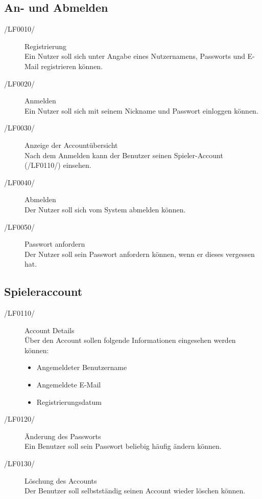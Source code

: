 \documentclass[11pt,a4paper]{scrreprt}
\begin{document}
\subsection{An- und Abmelden}
\begin{description}
\item[/LF0010/] Registrierung \\
Ein Nutzer soll sich unter Angabe eines Nutzernamens, Passworts und E-Mail registrieren können.

\item[/LF0020/] Anmelden \\
Ein Nutzer soll sich mit seinem Nickname und Passwort einloggen können.

\item[/LF0030/] Anzeige der Accountübersicht \\
Nach dem Anmelden kann der Benutzer seinen Spieler-Account (/LF0110/) einsehen.

\item[/LF0040/] Abmelden \\
Der Nutzer soll sich vom System abmelden können.

\item[/LF0050/] Passwort anfordern \\
Der Nutzer soll sein Passwort anfordern können, wenn er dieses vergessen hat.
\end{description}

\subsection{Spieleraccount}
\begin{description}
\item[/LF0110/] Account Details \\
Über den Account sollen folgende Informationen eingesehen werden können:
	\begin{itemize}
	\item Angemeldeter Benutzername
	\item Angemeldete E-Mail
	\item Registrierungsdatum
	\end{itemize}
	
\item[/LF0120/] Änderung des Passworts \\
Ein Benutzer soll sein Passwort beliebig häufig ändern können.

\item[/LF0130/] Löschung des Accounts \\
Der Benutzer soll selbstständig seinen Account wieder löschen können.
\end{description}
\end{document}
